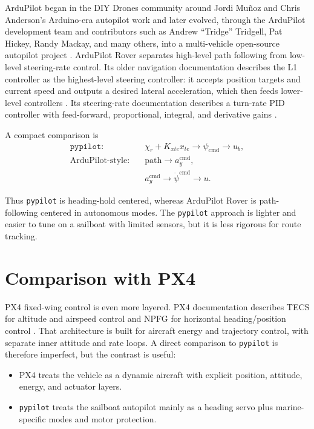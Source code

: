 \documentclass[10pt,twocolumn]{article}
\newcommand{\heading}{\psi}
\newcommand{\cmd}{\mathrm{cmd}}
\begin{document}
ArduPilot began in the DIY Drones community around Jordi Mu\~noz and Chris Anderson's
Arduino-era autopilot work and later evolved, through the ArduPilot development team and
contributors such as Andrew ``Tridge'' Tridgell, Pat Hickey, Randy Mackay, and many
others, into a multi-vehicle open-source autopilot project \cite{ardupilot-history}.
ArduPilot Rover separates high-level path following from low-level steering-rate control.
Its older navigation documentation describes the L1 controller as the highest-level
steering controller: it accepts position targets and current speed and outputs a desired
lateral acceleration, which then feeds lower-level controllers \cite{ardupilot-l1}.  Its
steering-rate documentation describes a turn-rate PID controller with feed-forward,
proportional, integral, and derivative gains \cite{ardupilot-rate}.

A compact comparison is
\begin{align}
\texttt{pypilot:}\quad
& \chi_r + K_{xte}x_{te} \to \heading_{\cmd} \to u_b, \\
\text{ArduPilot-style:}\quad
& \text{path} \to a_y^{\cmd}, \\
& a_y^{\cmd} \to \dot{\heading}^{\cmd} \to u.
\end{align}

Thus \texttt{pypilot} is heading-hold centered, whereas ArduPilot Rover is path-following
centered in autonomous modes.  The \texttt{pypilot} approach is lighter and easier to tune
on a sailboat with limited sensors, but it is less rigorous for route tracking.

\section{Comparison with PX4}

PX4 fixed-wing control is even more layered.  PX4 documentation describes TECS for
altitude and airspeed control and NPFG for horizontal heading/position control
\cite{px4-fw}.  That architecture is built for aircraft energy and trajectory control,
with separate inner attitude and rate loops.  A direct comparison to \texttt{pypilot} is
therefore imperfect, but the contrast is useful:
\begin{itemize}
\item PX4 treats the vehicle as a dynamic aircraft with explicit position, attitude,
energy, and actuator layers.
\item \texttt{pypilot} treats the sailboat autopilot mainly as a heading servo plus
marine-specific modes and motor protection.
\end{itemize}
\end{document}
